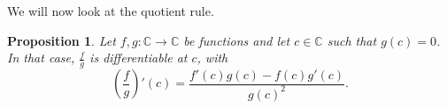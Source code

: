 \documentclass[a4paper, openany]{memoir}
\theoremstyle{definition}
\theoremstyle{plain}
\newtheorem{lemma}[definition]{Lemma}
\newtheorem{proposition}[definition]{Proposition}
\begin{document}
\noindent We will now look at the quotient rule. 
\begin{proposition}
Let $f, g: \mathbb{C} \to \mathbb{C}$ be functions and let $c \in \mathbb{C}$ such that $g(c) = 0$. In that case, $\frac{f}{g}$ is differentiable at $c$, with
\[\left(\frac{f}{g}\right)'(c) = \frac{f'(c) g(c) - f(c) g'(c)}{g(c)^2}.\]
\end{proposition}
\end{document}
